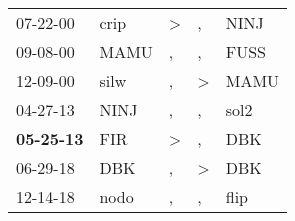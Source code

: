 \begin{supertabular}{p{0.07\textwidth}p{0.06\textwidth}p{0.02\textwidth}p{0.02\textwidth}p{0.06\textwidth}}
          07-22-00\textsuperscript{} &  crip\textsuperscript{} &  \textgreater &             , &  NINJ\textsuperscript{} \\
          09-08-00\textsuperscript{} &  MAMU\textsuperscript{} &             , &             , &  FUSS\textsuperscript{} \\
          12-09-00\textsuperscript{} &  silw\textsuperscript{} &             , &  \textgreater &  MAMU\textsuperscript{} \\
          04-27-13\textsuperscript{} &  NINJ\textsuperscript{} &             , &             , &  sol2\textsuperscript{} \\
 \textbf{05-25-13\textsuperscript{}} &   FIR\textsuperscript{} &  \textgreater &             , &   DBK\textsuperscript{} \\
          06-29-18\textsuperscript{} &   DBK\textsuperscript{} &             , &  \textgreater &   DBK\textsuperscript{} \\
          12-14-18\textsuperscript{} &  nodo\textsuperscript{} &             , &             , &  flip\textsuperscript{} \\
\end{supertabular}

